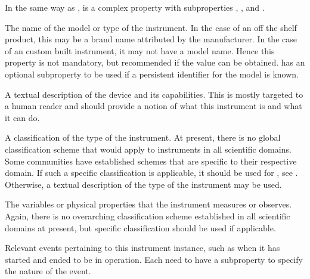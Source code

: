 \documentclass[a4paper,10pt,english]{sphinxmanual}
\begin{document}
\begin{description}
In the same way as ,  is a complex property
with subproperties , , and
.

\item[{\sphinxtitleref{Model}}] \leavevmode
The name of the model or type of the instrument.  In the
case of an off the shelf product, this may be a brand name
attributed by the manufacturer.  In the case of an custom built
instrument, it may not have a model name.  Hence this property is
not mandatory, but recommended if the value can be obtained.   has an
optional subproperty  to be used if a persistent
identifier for the model is known.

\item[{\sphinxtitleref{Description}}] \leavevmode
A textual description of the device and its capabilities.  This is
mostly targeted to a human reader and should provide a notion of
what this instrument is and what it can do.

\item[{\sphinxtitleref{InstrumentType}}] \leavevmode
A classification of the type of the instrument.  At present, there
is no global classification scheme that would apply to instruments
in all scientific domains.  Some communities have established
schemes that are specific to their respective domain.  If such a
specific classification is applicable, it should be used for
, see {\hyperref[\detokenize{white-paper/metadata-schema-recommendations:pidinst-metadata-schema-terminologies}]{}}.
Otherwise, a textual description of the type of the instrument may
be used.

\item[{\sphinxtitleref{MeasuredVariable}}] \leavevmode
The variables or physical properties that the instrument measures or
observes.  Again, there is no overarching classification scheme
established in all scientific domains at present, but specific
classification should be used if applicable.

\item[{\sphinxtitleref{Date}}] \leavevmode
Relevant events pertaining to this instrument instance, such as when
it has started and ended to be in operation.  Each  need to
have a  subproperty to specify the nature of the event.


\end{description}
\end{document}
